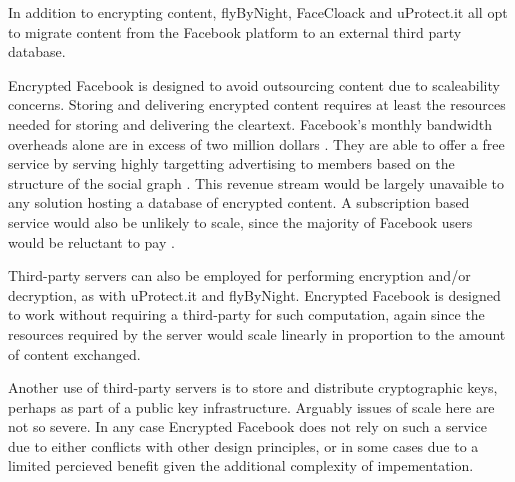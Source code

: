 
In addition to encrypting content, flyByNight, FaceCloack and uProtect.it all opt to migrate content from the Facebook platform to an external third party database.

Encrypted Facebook is designed to avoid outsourcing content due to scaleability concerns. Storing and delivering encrypted content requires at least the resources needed for storing and delivering the cleartext.  Facebook's monthly bandwidth overheads alone are in excess of two million dollars \cite{fb-costs}. They are able to offer a free service by serving highly targetting advertising to members based on the structure of the social graph \cite{fb-ads}. This revenue stream would be largely unavaible to any solution hosting a database of encrypted content. A subscription based service would also be unlikely to scale, since the majority of Facebook users would be reluctant to pay \cite{fb-pay}.


Third-party servers can also be employed for performing encryption and/or decryption, as with uProtect.it and flyByNight. Encrypted Facebook is designed to work without requiring a third-party for such computation, again since the resources required by the server would scale linearly in proportion to the amount of content exchanged.

Another use of third-party servers is to store and distribute cryptographic keys, perhaps as part of a public key infrastructure. Arguably issues of scale here are not so severe. In any case Encrypted Facebook does not rely on such a service due to either conflicts with other design principles, or in some cases due to a limited percieved benefit given the additional complexity of impementation.


